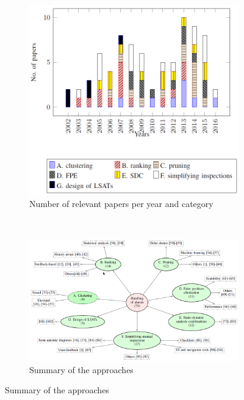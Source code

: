  \begin{figure}[H]
     \begin{subfigure}{1\textwidth}
         \centering
         \includegraphics[scale=0.4]{./src/survey_sa_papers.png}
         \caption{Number of relevant papers per year and category}\label{survey:papers}
     \end{subfigure}\\
     \begin{subfigure}{1\textwidth}
         \centering
         \includegraphics[scale=0.4]{./src/survey_sa_categories.png}
         \caption{Summary of the approaches}\label{survey:categories}
     \end{subfigure}
 \end{figure}


